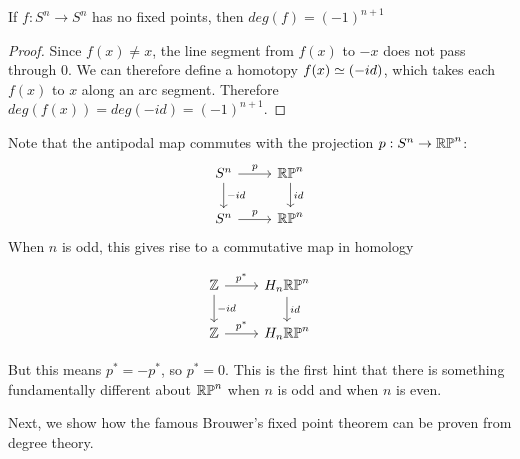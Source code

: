\begin{corollary}\label{fixed-points}
If $f:S^n\rightarrow S^n$ has no fixed points, then $deg(f)=(-1)^{n+1}$
\end{corollary}
\begin{proof}
Since $f(x)\neq x$, the line segment from $f(x)$ to $-x$ does not pass through $0$. We can therefore define a homotopy $f(x)\simeq (-id)$, which takes each $f(x)$ to $x$ along an arc segment. Therefore $deg(f(x))=deg(-id)=(-1)^{n+1}$.\cite{Hatcher}
\end{proof}

\begin{remark}
Note that the antipodal map commutes with the projection $p:S^n\rightarrow \mathbb{RP}^{n}$:
\[\begin{tikzcd}
S^n \arrow[r, "p"] \arrow[d, "-id"] & \RP{n} \arrow[d, "id"] \\
S^n \arrow[r, "p"]                    & \RP{n}                
\end{tikzcd}\]
When $n$ is odd, this gives rise to a commutative map in homology

\[\begin{tikzcd}
\mathbb{Z} \arrow[r, "p^*"] \arrow[d, "-id"] & H_n\RP{n} \arrow[d, "id"] \\
\mathbb{Z} \arrow[r, "p^*"]                 & H_n\RP{n}                
\end{tikzcd}\]

But this means $p^*=-p^*$, so $p^*=0$. This is the first hint that there is something fundamentally different about $\mathbb{RP}^{n}$ when $n$ is odd and when $n$ is even. 
\end{remark}


Next, we show how the famous Brouwer's fixed point theorem can be proven from degree theory.

